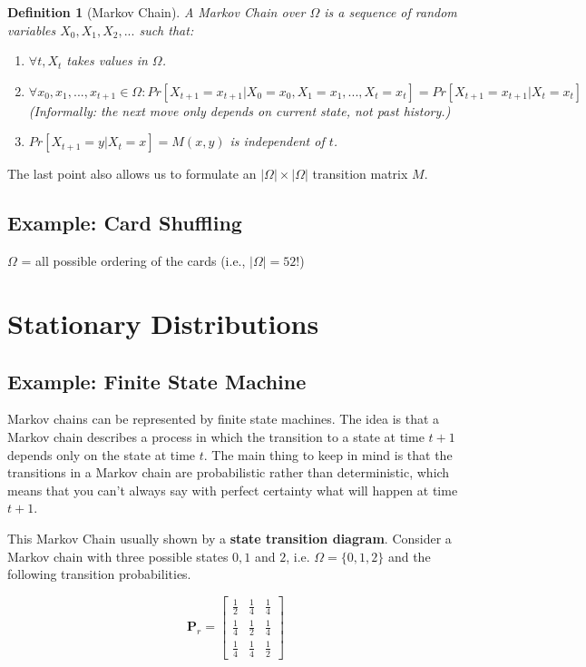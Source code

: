 \documentclass[twoside]{article}
\newtheorem{definition}[theorem]{Definition}
\begin{document}
\begin{definition}[Markov Chain]
   A Markov Chain over $\Omega$ is a sequence of random variables $X_0, X_1, X_2, ...$ such that:
   \begin{enumerate}
      \item $\forall t, X_t$ takes values in $\Omega$.
      \item $\forall x_0, x_1, ..., x_{t+1} \in \Omega: Pr[X_{t+1} = x_{t+1}|X_0 = x_0, X_1 = x_1, ..., X_t = x_t] = Pr[X_{t+1} = x_{t+1}|X_t = x_t]$ \\
      (Informally: the next move only depends on current state, not past history.)
      \item $Pr[X_{t+1} = y|X_t = x] = M(x, y)$ is independent of $t$.
   \end{enumerate}
\end{definition}

The last point also allows us to formulate an $|\Omega| \times |\Omega|$ transition matrix $M$.

\subsection{Example: Card Shuffling}

$\Omega$ = all possible ordering of the cards (i.e., $|\Omega| = 52!$)


\section{Stationary Distributions}

\subsection{Example: Finite State Machine}
Markov chains can be represented by finite state machines. The idea is that a Markov chain describes a process in which the transition to a state at time $t+1$ depends only on the state at time $t$. The main thing to keep in mind is that the transitions in a Markov chain are probabilistic rather than deterministic, which means that you can't always say with perfect certainty what will happen at time $t+1$.

This Markov Chain usually shown by a \textbf{state transition diagram}. Consider a Markov chain with three possible states $0, 1$ and $2$, i.e. $\Omega = \{0,1,2\}$ and the following transition probabilities.

\begin{equation}\mathbf{P}_r=\left[\begin{array}{ccc}
\frac{1}{2} & \frac{1}{4} & \frac{1}{4} \\
\frac{1}{4} & \frac{1}{2} & \frac{1}{4} \\
\frac{1}{4} & \frac{1}{4} & \frac{1}{2}
\end{array}\right]\end{equation}
\end{document}
